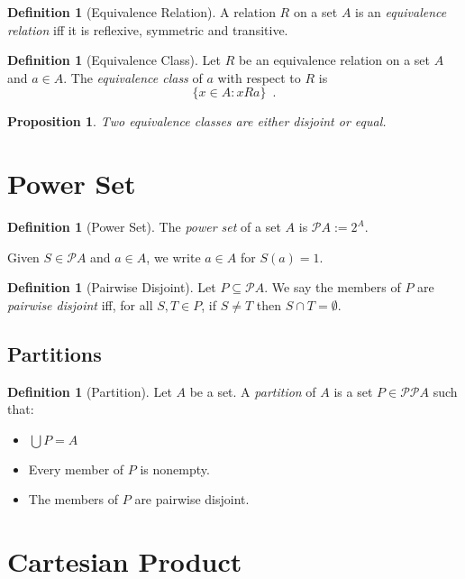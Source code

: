 \documentclass{book}
\newtheorem{prop}[ax]{Proposition}
\theoremstyle{definition}
\newtheorem{df}[ax]{Definition}
\begin{document}
\begin{df}[Equivalence Relation]
A relation $R$ on a set $A$ is an \emph{equivalence relation} iff it is reflexive, symmetric and transitive.
\end{df}

\begin{df}[Equivalence Class]
Let $R$ be an equivalence relation on a set $A$ and $a \in A$. The \emph{equivalence class} of $a$ with respect to $R$ is
\[ \{ x \in A : xRa \} \enspace . \]
\end{df}

\begin{prop}
Two equivalence classes are either disjoint or equal.
\end{prop}


\section{Power Set}

\begin{df}[Power Set]
The \emph{power set} of a set $A$ is $\mathcal{P} A := 2^A$.

Given $S \in \mathcal{P} A$ and $a \in A$, we write $a \in A$ for $S(a) = 1$.
\end{df}

\begin{df}[Pairwise Disjoint]
Let $P \subseteq \mathcal{P} A$. We say the members of $P$ are \emph{pairwise disjoint} iff, for all $S,T \in P$, if $S \neq T$ then $S \cap T = \emptyset$.
\end{df}

\subsection{Partitions}

\begin{df}[Partition]
Let $A$ be a set. A \emph{partition} of $A$ is a set $P \in \mathcal{P} \mathcal{P} A$ such that:
\begin{itemize}
\item $\bigcup P = A$
\item Every member of $P$ is nonempty.
\item The members of $P$ are pairwise disjoint.
\end{itemize}
\end{df}

\section{Cartesian Product}
\end{document}
